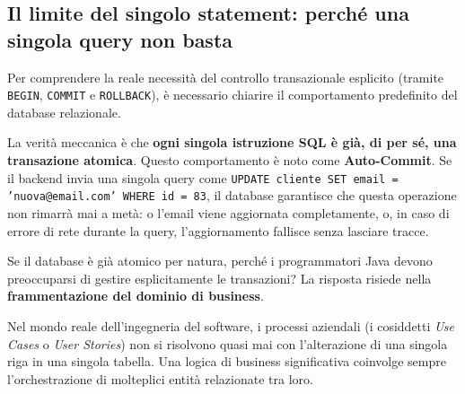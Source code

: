 \subsection{Il limite del singolo statement: perché una singola query non basta}

Per comprendere la reale necessità del controllo transazionale esplicito (tramite \texttt{BEGIN}, \texttt{COMMIT} e \texttt{ROLLBACK}), è necessario chiarire il comportamento predefinito del database relazionale.

La verità meccanica è che \textbf{ogni singola istruzione SQL è già, di per sé, una transazione atomica}. 
Questo comportamento è noto come \textbf{Auto-Commit}. Se il backend invia una singola query come \texttt{UPDATE cliente SET email = 'nuova@email.com' WHERE id = 83}, il database garantisce che questa operazione non rimarrà mai a metà: o l'email viene aggiornata completamente, o, in caso di errore di rete durante la query, l'aggiornamento fallisce senza lasciare tracce.

Se il database è già atomico per natura, perché i programmatori Java devono preoccuparsi di gestire esplicitamente le transazioni?
La risposta risiede nella \textbf{frammentazione del dominio di business}.

Nel mondo reale dell'ingegneria del software, i processi aziendali (i cosiddetti \textit{Use Cases} o \textit{User Stories}) non si risolvono quasi mai con l'alterazione di una singola riga in una singola tabella. Una logica di business significativa coinvolge sempre l'orchestrazione di molteplici entità relazionate tra loro.

